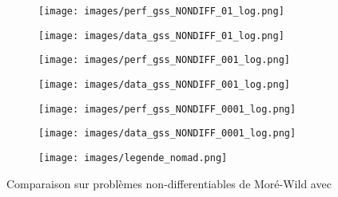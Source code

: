 	\begin{figure}[!htb] %
		\centering
		\begin{subfigure}{0.43\textwidth}
			\texttt{[image: images/perf\_gss\_NONDIFF\_01\_log.png]}
		\end{subfigure}%
		\begin{subfigure}{0.43\textwidth}
			\texttt{[image: images/data\_gss\_NONDIFF\_01\_log.png]}
		\end{subfigure}
		\smallskip
		\begin{subfigure}{0.43\textwidth}
			\texttt{[image: images/perf\_gss\_NONDIFF\_001\_log.png]}
		\end{subfigure}%
		\begin{subfigure}{0.43\textwidth}
			\texttt{[image: images/data\_gss\_NONDIFF\_001\_log.png]}
		\end{subfigure}
		\smallskip
		\begin{subfigure}{0.43\textwidth}
			\texttt{[image: images/perf\_gss\_NONDIFF\_0001\_log.png]}
		\end{subfigure}%
		\begin{subfigure}{0.43\textwidth}
			\texttt{[image: images/data\_gss\_NONDIFF\_0001\_log.png]}
		\end{subfigure}
		\smallskip
		\begin{subfigure}{0.95\textwidth}
			\texttt{[image: images/legende\_nomad.png]}
		\end{subfigure}
		\caption{Comparaison sur problèmes non-differentiables de Moré-Wild avec \MADS} \label{fig:1}
	\end{figure}
	\clearpage
